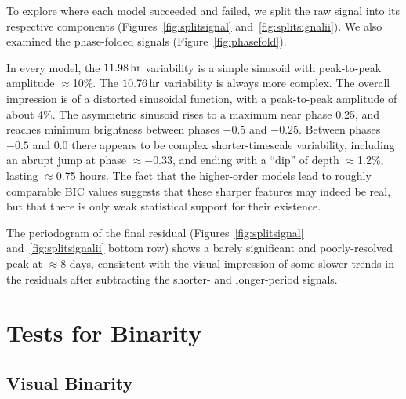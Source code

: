 \documentclass[12pt,twocolumn,tighten]{aastex62}
\begin{document}
To explore where each model succeeded and failed, we split the raw
signal into its respective components (Figures~\ref{fig:splitsignal}
and~\ref{fig:splitsignalii}).  We also examined the phase-folded
signals (Figure~\ref{fig:phasefold}).  

In every model, the $11.98\,{\rm hr}$ variability is a simple sinusoid
with peak-to-peak amplitude $\approx$10\%.  The $10.76\,{\rm hr}$
variability is always more complex.  The overall impression is of a
distorted sinusoidal function, with a peak-to-peak amplitude of about
4\%.  The asymmetric sinusoid rises to a maximum near phase 0.25, and
reaches minimum brightness between phases $-0.5$ and $-0.25$.  Between
phases $-0.5$ and $0.0$ there appears to be complex shorter-timescale
variability, including an abrupt jump at phase $\approx -0.33$, and
ending with a ``dip'' of depth $\approx$1.2\%, lasting $\approx$0.75
hours.  The fact that the higher-order models lead to roughly
comparable BIC values suggests that these sharper features may indeed
be real, but that there is only weak statistical support for their
existence.

The periodogram of the final residual (Figures~\ref{fig:splitsignal}
and~\ref{fig:splitsignalii} bottom row) shows a barely significant and
poorly-resolved peak at $\approx$8 days, consistent with the visual
impression of some slower trends in the residuals after subtracting
the shorter- and longer-period signals.

\section{Tests for Binarity}
\label{sec:gaia}

\subsection{Visual Binarity}
\label{subsec:blend}
\end{document}
